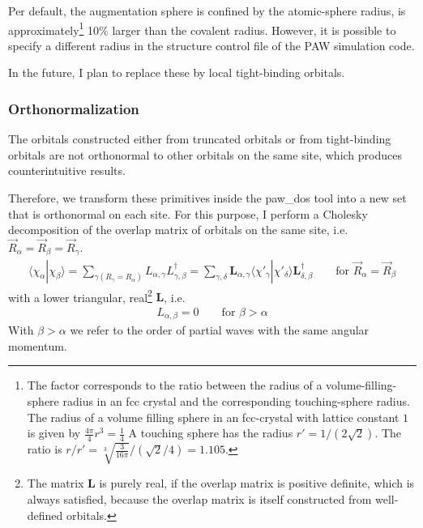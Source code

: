 \documentclass[final,12pt]{article}
\newcommand{\mat}[1]{\mathbf{#1}}
\begin{document}
{{{{{{Per default, the augmentation sphere is confined by the atomic-sphere
radius, is approximately\footnote{The factor corresponds to the ratio
  between the radius of a volume-filling-sphere radius in an fcc
  crystal and the corresponding touching-sphere radius.  The radius of
  a volume filling sphere in an fcc-crystal with lattice constant $1$
  is given by $\frac{4\pi}{4}r^3=\frac{1}{4}$ A touching sphere has
  the radius $r'=1/(2\sqrt{2})$. The ratio is
  $r/r'=\sqrt[3]{\frac{3}{16\pi}}/(\sqrt{2}/4)=1.105$.} 10\% larger
than the covalent radius.  However, it is possible to specify a
different radius in the structure control file of the PAW simulation
code.

In the future, I plan to replace these by local tight-binding orbitals.

\subsubsection{Orthonormalization}
The orbitals constructed either from truncated orbitals or from
tight-binding orbitals are not orthonormal to other orbitals on the
same site, which produces counterintuitive results.

Therefore, we transform these primitives inside the paw\_dos tool into
a new set that is orthonormal on each site. For this purpose, I
perform a Cholesky decomposition of the overlap matrix of orbitals on
the same site, i.e. $\vec{R}_{\alpha}=\vec{R}_\beta=\vec{R}_\gamma$.
\begin{eqnarray}
\langle\chi_\alpha|\chi_\beta\rangle
=\sum_{\gamma (R_\gamma=R_\alpha)}  L_{\alpha,\gamma}L^\dagger_{\gamma,\beta}
=\sum_{\gamma,\delta}\mat{L}_{\alpha,\gamma}
\langle\chi'_\gamma|\chi'_\delta\rangle
\mat{L}^\dagger_{\delta,\beta}
\qquad\text{for $\vec{R}_\alpha=\vec{R}_\beta$}
\end{eqnarray}
with a lower triangular, real\footnote{The matrix $\mat{L}$ is purely
  real, if the overlap matrix is positive definite, which is always
  satisfied, because the overlap matrix is itself constructed from
  well-defined orbitals.} $\mat{L}$, i.e.
\begin{eqnarray}
L_{\alpha,\beta}=0\qquad\text{for $\beta>\alpha$}
\end{eqnarray}
With $\beta>\alpha$ we refer to the order of partial waves with the
same angular momentum. 

}}}}}}
\end{document}
